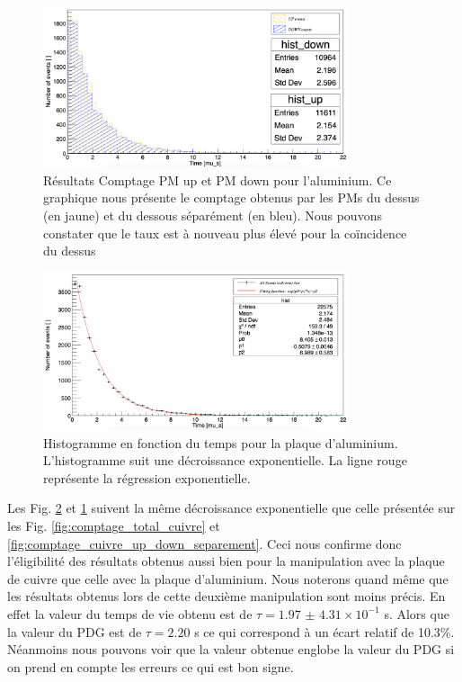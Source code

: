 \documentclass[12pt]{article}
\begin{document}
\begin{figure}
    \centering
    \includegraphics[width=0.8\textwidth]{graphiques/experience1/Aluminium/comptage_Aluminium_up_down_separement.png}
    \caption{Résultats Comptage PM up et PM down pour l'aluminium. Ce graphique nous présente le comptage obtenus par les PMs du dessus (en jaune) et du dessous séparément (en bleu). Nous pouvons constater que le taux est à nouveau plus élevé pour la coïncidence du dessus}
    \label{fig:comptage_Aluminium_up_down_separement}
\end{figure}

\begin{figure}
    \centering
    \includegraphics[width=0.8\textwidth]{graphiques/experience1/Aluminium/comptage_total_Aluminium.png}
    \caption{Histogramme en fonction du temps pour la plaque d'aluminium. L’histogramme suit une décroissance exponentielle. La ligne rouge représente la régression exponentielle.}
    \label{fig:comptage_total_aluminium}
\end{figure}

Les Fig. \ref{fig:comptage_total_aluminium} et \ref{fig:comptage_Aluminium_up_down_separement} suivent la même décroissance exponentielle que celle présentée sur les Fig. \ref{fig:comptage_total_cuivre} et \ref{fig:comptage_cuivre_up_down_separement}. Ceci nous confirme donc l'éligibilité des résultats obtenus aussi bien pour la manipulation avec la plaque de cuivre que celle avec la plaque d'aluminium. Nous noterons quand même que les résultats obtenus lors de cette deuxième manipulation sont moins précis. En effet la valeur du temps de vie obtenu est de $\tau=1.97$ $\pm$ $4.31\times10^{-1}$ \SIUnitSymbolMicro s. Alors que la valeur du PDG est de $\tau=2.20$ \SIUnitSymbolMicro s ce qui correspond à un écart relatif de 10.3\%. Néanmoins nous pouvons voir que la valeur obtenue englobe la valeur du PDG si on prend en compte les erreurs ce qui est bon signe. 
\end{document}
